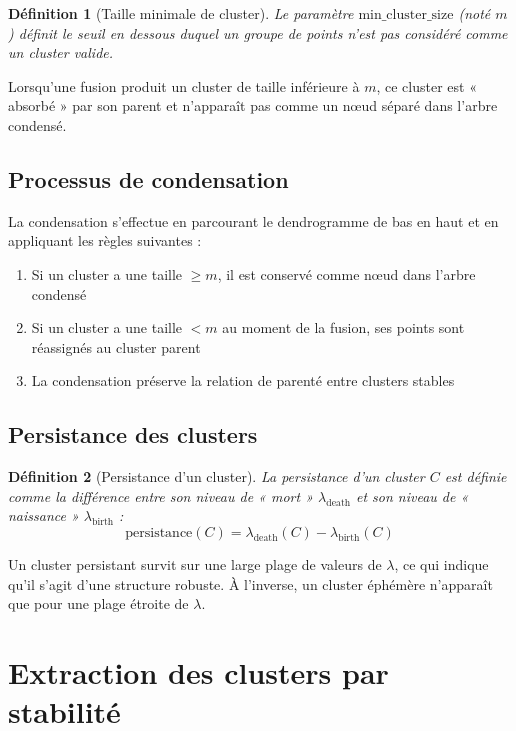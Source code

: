 \documentclass[11pt,a4paper]{article}
\newtheorem{definition}{Définition}[section]
\begin{document}
\begin{definition}[Taille minimale de cluster]
Le paramètre $\text{min\_cluster\_size}$ (noté $m$) définit le seuil en dessous duquel un groupe de points n'est pas considéré comme un cluster valide.
\end{definition}

Lorsqu'une fusion produit un cluster de taille inférieure à $m$, ce cluster est « absorbé » par son parent et n'apparaît pas comme un nœud séparé dans l'arbre condensé.

\subsection{Processus de condensation}

La condensation s'effectue en parcourant le dendrogramme de bas en haut et en appliquant les règles suivantes :

\begin{enumerate}
    \item Si un cluster a une taille $\geq m$, il est conservé comme nœud dans l'arbre condensé
    \item Si un cluster a une taille $< m$ au moment de la fusion, ses points sont réassignés au cluster parent
    \item La condensation préserve la relation de parenté entre clusters stables
\end{enumerate}

\subsection{Persistance des clusters}

\begin{definition}[Persistance d'un cluster]
La \textit{persistance} d'un cluster $C$ est définie comme la différence entre son niveau de « mort » $\lambda_{\text{death}}$ et son niveau de « naissance » $\lambda_{\text{birth}}$ :
\begin{equation}
\text{persistance}(C) = \lambda_{\text{death}}(C) - \lambda_{\text{birth}}(C)
\end{equation}
\end{definition}

Un cluster persistant survit sur une large plage de valeurs de $\lambda$, ce qui indique qu'il s'agit d'une structure robuste. À l'inverse, un cluster éphémère n'apparaît que pour une plage étroite de $\lambda$.

\section{Extraction des clusters par stabilité}
\end{document}
